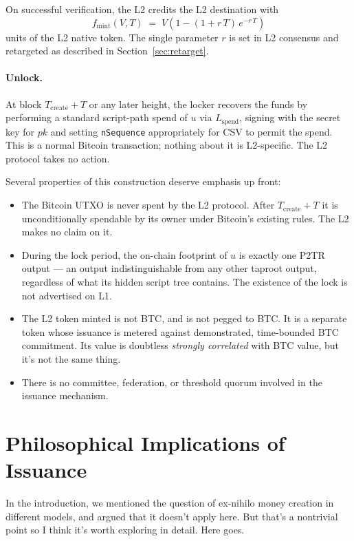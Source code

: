 \documentclass[11pt,a4paper]{article}
\newcommand{\fmint}{f_{\mathrm{mint}}}
\begin{document}
On successful verification, the L2 credits the L2 destination with
\begin{equation}
\label{eq:mintfn}
\fmint(V, T) \;=\; V\!\left(1 - (1 + r\,T)\,e^{-r\,T}\right)
\end{equation}
units of the L2 native token. The single parameter $r$ is set in L2 consensus and retargeted as described in Section~\ref{sec:retarget}.

\paragraph{Unlock.} At block $T_{\mathrm{create}} + T$ or any later height, the locker recovers the funds by performing a standard script-path spend of $u$ via $L_{\mathrm{spend}}$, signing with the secret key for $pk$ and setting \texttt{nSequence} appropriately for CSV to permit the spend. This is a normal Bitcoin transaction; nothing about it is L2-specific. The L2 protocol takes no action.

Several properties of this construction deserve emphasis up front:

\begin{itemize}[leftmargin=*]
  \item The Bitcoin UTXO is never spent by the L2 protocol. After $T_{\mathrm{create}} + T$ it is unconditionally spendable by its owner under Bitcoin's existing rules. The L2 makes no claim on it.
  \item During the lock period, the on-chain footprint of $u$ is exactly one P2TR output --- an output indistinguishable from any other taproot output, regardless of what its hidden script tree contains. The existence of the lock is not advertised on L1.
  \item The L2 token minted is not BTC, and is not pegged to BTC. It is a separate token whose issuance is metered against demonstrated, time-bounded BTC commitment. Its value is doubtless \emph{strongly correlated} with BTC value, but it's not the same thing.
  \item There is no committee, federation, or threshold quorum involved in the issuance mechanism.
\end{itemize}

\section{Philosophical Implications of Issuance}
\label{sec:philosophy}

In the introduction, we mentioned the question of ex-nihilo money creation in different models, and argued that it doesn't apply here. But that's a nontrivial point so I think it's worth exploring in detail. Here goes.
\end{document}
